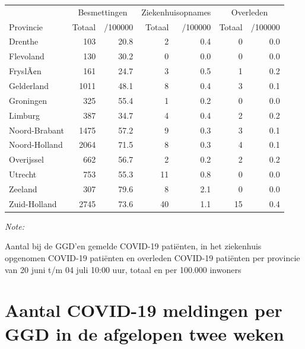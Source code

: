 \documentclass[
  english,
  man,floatsintext]{apa6}
\begin{document}
\begin{table}
\centering
\begin{threeparttable}
\begin{tabular}{lrrrrrr}
\toprule
\multicolumn{1}{c}{ } & \multicolumn{2}{c}{Besmettingen} & \multicolumn{2}{c}{Ziekenhuisopnames} & \multicolumn{2}{c}{Overleden} \\
\cmidrule(l{3pt}r{3pt}){2-3} \cmidrule(l{3pt}r{3pt}){4-5} \cmidrule(l{3pt}r{3pt}){6-7}
Provincie & Totaal & /100000 & Totaal & /100000 & Totaal & /100000\\
\midrule
Drenthe & 103 & 20.8 & 2 & 0.4 & 0 & 0.0\\
Flevoland & 130 & 30.2 & 0 & 0.0 & 0 & 0.0\\
FryslÃ¢n & 161 & 24.7 & 3 & 0.5 & 1 & 0.2\\
Gelderland & 1011 & 48.1 & 8 & 0.4 & 3 & 0.1\\
Groningen & 325 & 55.4 & 1 & 0.2 & 0 & 0.0\\
Limburg & 387 & 34.7 & 4 & 0.4 & 2 & 0.2\\
Noord-Brabant & 1475 & 57.2 & 9 & 0.3 & 3 & 0.1\\
Noord-Holland & 2064 & 71.5 & 8 & 0.3 & 4 & 0.1\\
Overijssel & 662 & 56.7 & 2 & 0.2 & 2 & 0.2\\
Utrecht & 753 & 55.3 & 11 & 0.8 & 0 & 0.0\\
Zeeland & 307 & 79.6 & 8 & 2.1 & 0 & 0.0\\
Zuid-Holland & 2745 & 73.6 & 40 & 1.1 & 15 & 0.4\\
\bottomrule
\end{tabular}
\begin{tablenotes}
\item \textit{Note: } 
\item Aantal bij de GGD’en gemelde COVID-19 patiënten, in het ziekenhuis opgenomen COVID-19 patiënten en overleden COVID-19 patiënten per provincie van 20 juni t/m 04 juli 10:00 uur, totaal en per 100.000 inwoners
\end{tablenotes}
\end{threeparttable}
\end{table}

\newpage

\hypertarget{aantal-covid-19-meldingen-per-ggd-in-de-afgelopen-twee-weken}{%
\section{Aantal COVID-19 meldingen per GGD in de afgelopen twee weken}\label{aantal-covid-19-meldingen-per-ggd-in-de-afgelopen-twee-weken}}
\end{document}
